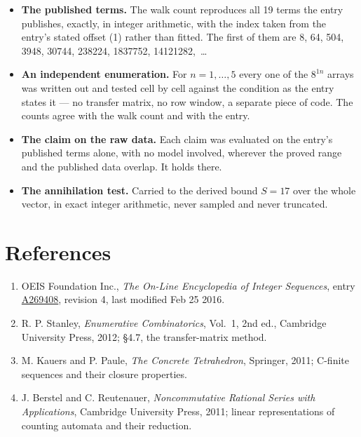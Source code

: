 \documentclass[11pt]{article}
\theoremstyle{definition}
\begin{document}
\begin{itemize}

\item {\bfseries The published terms.} The walk count reproduces all 19 terms the entry publishes, exactly, in integer arithmetic, with the index taken from the entry's stated offset (1) rather than fitted. The first of them are 8, 64, 504, 3948, 30744, 238224, 1837752, 14121282,~\dots

\item {\bfseries An independent enumeration.} For $n = 1,\dots,5$ every one of the $8^{1n}$ arrays was written out and tested cell by cell against the condition as the entry states it --- no transfer matrix, no row window, a separate piece of code. The counts agree with the walk count and with the entry.

\item {\bfseries The claim on the raw data.} Each claim was evaluated on the entry's published terms alone, with no model involved, wherever the proved range and the published data overlap. It holds there.

\item {\bfseries The annihilation test.} Carried to the derived bound $S = 17$ over the whole vector, in exact integer arithmetic, never sampled and never truncated.

\end{itemize}

\section{References}

\begin{enumerate}

\item OEIS Foundation Inc., \emph{The On-Line Encyclopedia of Integer Sequences}, entry \href{https://oeis.org/A269408}{A269408}, revision 4, last modified Feb 25 2016.

\item R. P. Stanley, \emph{Enumerative Combinatorics}, Vol.~1, 2nd ed., Cambridge University Press, 2012; \S4.7, the transfer-matrix method.

\item M. Kauers and P. Paule, \emph{The Concrete Tetrahedron}, Springer, 2011; C-finite sequences and their closure properties.

\item J. Berstel and C. Reutenauer, \emph{Noncommutative Rational Series with Applications}, Cambridge University Press, 2011; linear representations of counting automata and their reduction.

\end{enumerate}
\end{document}
